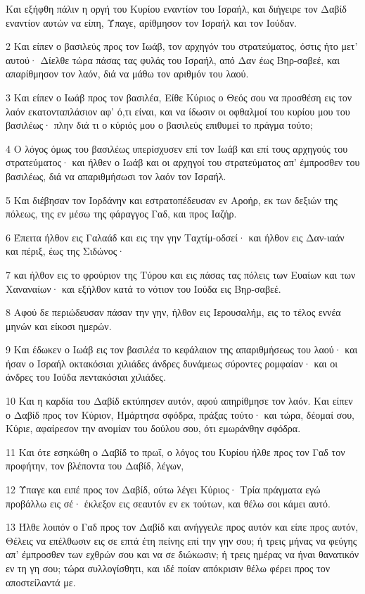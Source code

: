 \par Και εξήφθη πάλιν η οργή του Κυρίου εναντίον του Ισραήλ, και διήγειρε τον Δαβίδ εναντίον αυτών να είπη, Ύπαγε, αρίθμησον τον Ισραήλ και τον Ιούδαν.
\par 2 Και είπεν ο βασιλεύς προς τον Ιωάβ, τον αρχηγόν του στρατεύματος, όστις ήτο μετ' αυτού· Δίελθε τώρα πάσας τας φυλάς του Ισραήλ, από Δαν έως Βηρ-σαβεέ, και απαρίθμησον τον λαόν, διά να μάθω τον αριθμόν του λαού.
\par 3 Και είπεν ο Ιωάβ προς τον βασιλέα, Είθε Κύριος ο Θεός σου να προσθέση εις τον λαόν εκατονταπλάσιον αφ' ό,τι είναι, και να ίδωσιν οι οφθαλμοί του κυρίου μου του βασιλέως· πλην διά τι ο κύριός μου ο βασιλεύς επιθυμεί το πράγμα τούτο;
\par 4 Ο λόγος όμως του βασιλέως υπερίσχυσεν επί τον Ιωάβ και επί τους αρχηγούς του στρατεύματος· και ήλθεν ο Ιωάβ και οι αρχηγοί του στρατεύματος απ' έμπροσθεν του βασιλέως, διά να απαριθμήσωσι τον λαόν τον Ισραήλ.
\par 5 Και διέβησαν τον Ιορδάνην και εστρατοπέδευσαν εν Αροήρ, εκ των δεξιών της πόλεως, της εν μέσω της φάραγγος Γαδ, και προς Ιαζήρ.
\par 6 Έπειτα ήλθον εις Γαλαάδ και εις την γην Ταχτίμ-οδσεί· και ήλθον εις Δαν-ιαάν και πέριξ, έως της Σιδώνος·
\par 7 και ήλθον εις το φρούριον της Τύρου και εις πάσας τας πόλεις των Ευαίων και των Χαναναίων· και εξήλθον κατά το νότιον του Ιούδα εις Βηρ-σαβεέ.
\par 8 Αφού δε περιώδευσαν πάσαν την γην, ήλθον εις Ιερουσαλήμ, εις το τέλος εννέα μηνών και είκοσι ημερών.
\par 9 Και έδωκεν ο Ιωάβ εις τον βασιλέα το κεφάλαιον της απαριθμήσεως του λαού· και ήσαν ο Ισραήλ οκτακόσιαι χιλιάδες άνδρες δυνάμεως σύροντες ρομφαίαν· και οι άνδρες του Ιούδα πεντακόσιαι χιλιάδες.
\par 10 Και η καρδία του Δαβίδ εκτύπησεν αυτόν, αφού απηρίθμησε τον λαόν. Και είπεν ο Δαβίδ προς τον Κύριον, Ημάρτησα σφόδρα, πράξας τούτο· και τώρα, δέομαί σου, Κύριε, αφαίρεσον την ανομίαν του δούλου σου, ότι εμωράνθην σφόδρα.
\par 11 Και ότε εσηκώθη ο Δαβίδ το πρωΐ, ο λόγος του Κυρίου ήλθε προς τον Γαδ τον προφήτην, τον βλέποντα του Δαβίδ, λέγων,
\par 12 Ύπαγε και ειπέ προς τον Δαβίδ, ούτω λέγει Κύριος· Τρία πράγματα εγώ προβάλλω εις σέ· έκλεξον εις σεαυτόν εν εκ τούτων, και θέλω σοι κάμει αυτό.
\par 13 Ήλθε λοιπόν ο Γαδ προς τον Δαβίδ και ανήγγειλε προς αυτόν και είπε προς αυτόν, Θέλεις να επέλθωσιν εις σε επτά έτη πείνης επί την γην σου; ή τρεις μήνας να φεύγης απ' έμπροσθεν των εχθρών σου και να σε διώκωσιν; ή τρεις ημέρας να ήναι θανατικόν εν τη γη σου; τώρα συλλογίσθητι, και ιδέ ποίαν απόκρισιν θέλω φέρει προς τον αποστείλαντά με.
